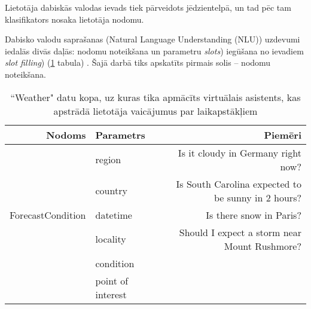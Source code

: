 Lietotāja dabiskās valodas ievads tiek pārveidots jēdzientelpā, un tad pēc tam klasifikators nosaka lietotāja nodomu.

Dabisko valodu saprašanas (Natural Language Understanding (NLU)) uzdevumi iedalās divās daļās: nodomu noteikšana un parametru \textit{slots}) iegūšana no ievadiem \textit{slot filling}) (\ref{tab:slots} tabula) \cite{snips-2018}. Šajā darbā tiks apskatīts pirmais solis -- nodomu noteikšana.


\begin{table}[htbp]
    \centering
    \caption{``Weather" datu kopa, uz kuras tika apmācīts virtuālais asistents, kas apstrādā lietotāja vaicājumus par laikapstākļiem  \cite{snips-2018}}
    \begin{tabular}{rlr}\toprule
        Nodoms            & Parametrs                                           & Piemēri                                                                                                                                           \\\midrule
        & \textcolor[rgb]{ .439,  .188,  .627}{ region}           & Is it \textcolor[rgb]{ 1,  .753,  0}{cloudy} in \textcolor[rgb]{ 1,  0,  0}{Germany} \textcolor[rgb]{ .573,  .816,  .314}{ right now}?                         \\
        & \textcolor[rgb]{ 1,  0,  0}{ country}                   & Is \textcolor[rgb]{ .439,  .188,  .627}{South Carolina} expected to be \textcolor[rgb]{ 1,  .753,  0}{sunny} \textcolor[rgb]{ .573,  .816,  .314}{in 2 hours}? \\
        ForecastCondition & \textcolor[rgb]{ .573,  .816,  .314}{ datetime}         & Is there \textcolor[rgb]{ 1,  .753,  0}{snow} in \textcolor[rgb]{ 0,  .69,  .941}{Paris}?                                                                  \\
        & \textcolor[rgb]{ 0,  .69,  .941}{ locality}             & Should I expect a \textcolor[rgb]{ 1,  .753,  0}{storm} near \textcolor[rgb]{ .929,  .49,  .192}{Mount Rushmore}?                                          \\
        & \textcolor[rgb]{ 1,  .753,  0}{ condition}              &                                                                                                                                                    \\
        & \textcolor[rgb]{ .929,  .49,  .192}{ point of interest} &                                                                                                                                                    \\\bottomrule
    \end{tabular}%
    \label{tab:slots}%
\end{table}%


